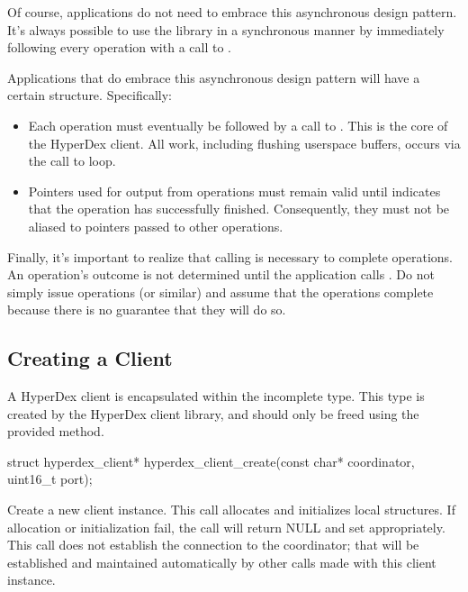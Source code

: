 Of course, applications do not need to embrace this asynchronous design pattern.
It's always possible to use the library in a synchronous manner by immediately
following every operation with a call to .

Applications that do embrace this asynchronous design pattern will have a
certain structure.  Specifically:

\begin{itemize}
\item Each operation must eventually be followed by a call to
.  This is the core of the HyperDex client.  All
work, including flushing userspace buffers, occurs via the call to loop.

\item Pointers used for output from operations must remain valid until
 indicates that the operation has successfully
finished.  Consequently, they must not be aliased to pointers passed to other
operations.
\end{itemize}

Finally, it's important to realize that calling  is
necessary to complete operations.  An operation's outcome is not determined
until the application calls .  Do not simply issue
 operations (or similar) and assume that the
operations complete because there is no guarantee that they will do so.

\subsection{Creating a Client}
\label{sec:api:c:client:create}

A HyperDex client is encapsulated within the incomplete  type.  This type is created by the HyperDex client library,
and should only be freed using the provided method.

\begin{ccode}
struct hyperdex_client*
hyperdex_client_create(const char* coordinator, uint16_t port);
\end{ccode}
Create a new client instance.  This call allocates and initializes
local structures.  If allocation or initialization fail, the call will return
NULL and set  appropriately.  This call does not establish the
connection to the coordinator; that will be established and maintained
automatically by other calls made with this client instance.

